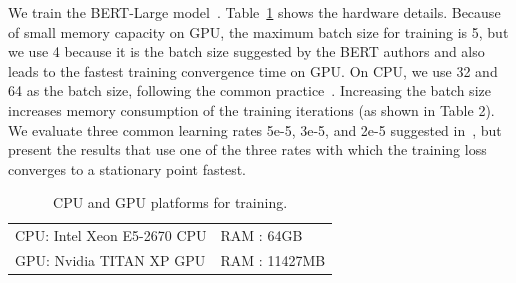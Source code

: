 We %
\textcolor{check}{train} the BERT-Large model~\cite{devlin2018bert}.  Table~\ref{tab:hw_gpu} shows the hardware details. 
Because of small memory capacity on GPU, the maximum batch size for training is 5, but \textcolor{check}{we use 4 because it is the batch size suggested by the BERT authors and also leads to the fastest training convergence time on GPU}. On CPU, \textcolor{check}{we use 32 and 64 as the batch size}, following the common practice~\cite{devlin2018bert}.  \textcolor{check}{Increasing the batch size increases memory consumption of the training iterations (as shown in Table 2).} We evaluate three common learning rates 5e-5, 3e-5, and 2e-5 suggested in~\cite{devlin2018bert}, but present the results that use one of the three rates %
\textcolor{check}{with which the training loss converges to a stationary point fastest.}

\begin{table}[t]
\centering
\caption{\textcolor{check}{CPU and GPU platforms for training.}}
\vspace{-7pt}
\begin{tabular}{ll}
\hline
CPU: Intel Xeon E5-2670 CPU & RAM : 64GB\\ %
GPU: Nvidia TITAN XP GPU & RAM : 11427MB\\
\hline
\end{tabular}
\vspace{-5pt}
\label{tab:hw_gpu}
\end{table}

